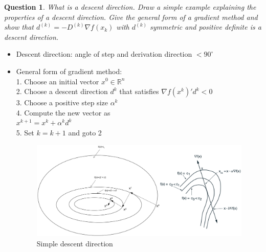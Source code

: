 \documentclass{article}
\newtheorem{question}{Question}
\newcommand{\kth}[2][k]{#2^{(#1)}}
\begin{document}
\begin{question}
  What is a descent direction. Draw a simple example explaining the properties of a descent
  direction. Give the general form of a gradient method and show that
  \(\kth{d} = -\kth{D} \nabla f(x_k)\) with \(\kth{d}\) symmetric and positive definite is a descent
  direction.
\end{question}
\begin{itemize}
\item Descent direction: angle of step and derivation direction $< 90^\circ$
\item General form of gradient method: \\
  1. Choose an initial vector $x ^0 \in \mathbb{R}^n$\\
  2. Choose a descent direction $d^k$ that satisfies $\nabla f (x^k)'  d^k < 0$\\
  3. Choose a positive step size $\alpha^k$\\
  4. Compute the new vector as\\
  $x^{k+1} = x^k + \alpha^k d^k$\\
  5. Set $k = k + 1$ and goto 2
  \begin{figure}[H]
    \includegraphics[width=\textwidth]{desc_dir.png}
    \caption{Simple descent direction\label{fig:desc_dir}}
  \end{figure}
\end{itemize}
\end{document}
